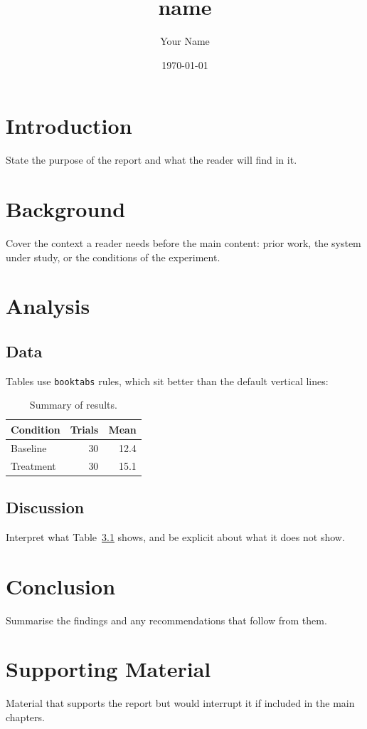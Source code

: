 \documentclass[11pt,a4paper]{report}
\title{{name}}
\author{Your Name}
\date{\today}
\begin{document}
\maketitle

\tableofcontents

\chapter{Introduction}

State the purpose of the report and what the reader will find in it.

\chapter{Background}

Cover the context a reader needs before the main content: prior work,
the system under study, or the conditions of the experiment.

\chapter{Analysis}

\section{Data}

Tables use \texttt{booktabs} rules, which sit better than the default
vertical lines:

\begin{table}[htbp]
    \centering
    \begin{tabular}{lrr}
        \toprule
        Condition & Trials & Mean \\
        \midrule
        Baseline  & 30     & 12.4 \\
        Treatment & 30     & 15.1 \\
        \bottomrule
    \end{tabular}
    \caption{Summary of results.}
    \label{tab:summary}
\end{table}

\section{Discussion}

Interpret what Table~\ref{tab:summary} shows, and be explicit about
what it does not show.

\chapter{Conclusion}

Summarise the findings and any recommendations that follow from them.

\appendix

\chapter{Supporting Material}

Material that supports the report but would interrupt it if included
in the main chapters.
\end{document}
